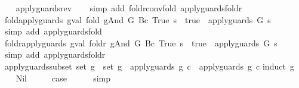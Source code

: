 \begin{isabellebody}
\ \ %
\endisadelimproof
%
\isatagproof
{}\isamarkupfalse%
\ apply{\isacharunderscore}guards{\isacharunderscore}rev\isanewline
\ \ \isamarkupfalse%
\ {\isacharparenleft}simp\ add{\isacharcolon}\ foldr{\isacharunderscore}conv{\isacharunderscore}fold\ apply{\isacharunderscore}guards{\isacharunderscore}foldr{\isacharparenright}%
\endisatagproof
{\isafoldproof}%
%
\isadelimproof
\isanewline
%
\endisadelimproof
\isanewline
{}\isamarkupfalse%
\ fold{\isacharunderscore}apply{\isacharunderscore}guards{\isacharcolon}\ {\isachardoublequoteopen}{\isacharparenleft}gval\ {\isacharparenleft}fold\ gAnd\ G\ {\isacharparenleft}Bc\ True{\isacharparenright}{\isacharparenright}\ s\ {\isacharequal}\ true{\isacharparenright}\ {\isacharequal}\ apply{\isacharunderscore}guards\ G\ s{\isachardoublequoteclose}\isanewline
%
\isadelimproof
\ \ %
\endisadelimproof
%
\isatagproof
{}\isamarkupfalse%
\ {\isacharparenleft}simp\ add{\isacharcolon}\ apply{\isacharunderscore}guards{\isacharunderscore}fold{\isacharparenright}%
\endisatagproof
{\isafoldproof}%
%
\isadelimproof
\isanewline
%
\endisadelimproof
\isanewline
{}\isamarkupfalse%
\ foldr{\isacharunderscore}apply{\isacharunderscore}guards{\isacharcolon}\ {\isachardoublequoteopen}{\isacharparenleft}gval\ {\isacharparenleft}foldr\ gAnd\ G\ {\isacharparenleft}Bc\ True{\isacharparenright}{\isacharparenright}\ s\ {\isacharequal}\ true{\isacharparenright}\ {\isacharequal}\ apply{\isacharunderscore}guards\ G\ s{\isachardoublequoteclose}\isanewline
%
\isadelimproof
\ \ %
\endisadelimproof
%
\isatagproof
{}\isamarkupfalse%
\ {\isacharparenleft}simp\ add{\isacharcolon}\ apply{\isacharunderscore}guards{\isacharunderscore}foldr{\isacharparenright}%
\endisatagproof
{\isafoldproof}%
%
\isadelimproof
\isanewline
%
\endisadelimproof
\isanewline
{}\isamarkupfalse%
\ apply{\isacharunderscore}guards{\isacharunderscore}subset{\isacharcolon}\ {\isachardoublequoteopen}set\ g{\isacharprime}\ {\isasymsubseteq}\ set\ g\ {\isasymLongrightarrow}\ apply{\isacharunderscore}guards\ g\ c\ {\isasymlongrightarrow}\ apply{\isacharunderscore}guards\ g{\isacharprime}\ c{\isachardoublequoteclose}\isanewline
%
\isadelimproof
%
\endisadelimproof
%
\isatagproof
{}\isamarkupfalse%
{\isacharparenleft}induct\ g{\isacharparenright}\isanewline
\ \ \isamarkupfalse%
\ Nil\isanewline
\ \ \isamarkupfalse%
\ \isamarkupfalse%
\ {\isacharquery}case\isanewline
\ \ \ \ \isamarkupfalse%
\ simp\isanewline
{}\isamarkupfalse%

\end{isabellebody}
